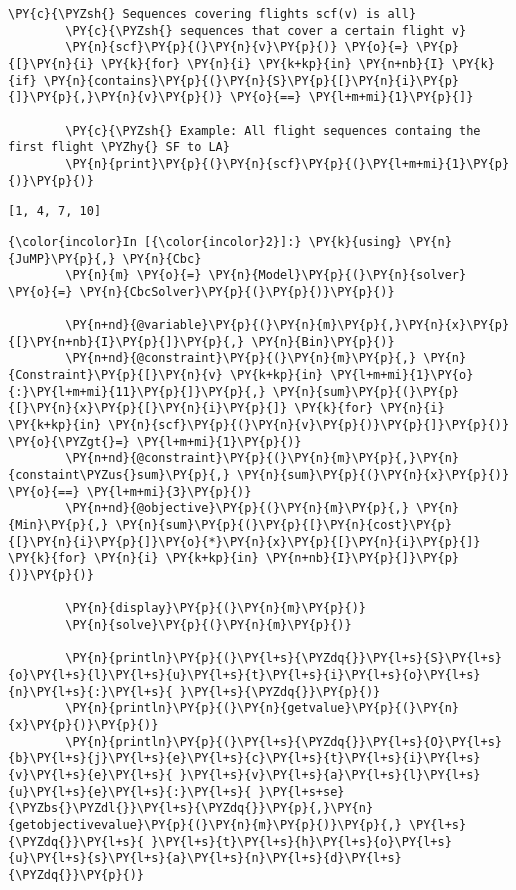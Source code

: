 \begin{Verbatim}[commandchars=\\\{\}]
        \PY{c}{\PYZsh{} Sequences covering flights scf(v) is all}
        \PY{c}{\PYZsh{} sequences that cover a certain flight v}
        \PY{n}{scf}\PY{p}{(}\PY{n}{v}\PY{p}{)} \PY{o}{=} \PY{p}{[}\PY{n}{i} \PY{k}{for} \PY{n}{i} \PY{k+kp}{in} \PY{n+nb}{I} \PY{k}{if} \PY{n}{contains}\PY{p}{(}\PY{n}{S}\PY{p}{[}\PY{n}{i}\PY{p}{]}\PY{p}{,}\PY{n}{v}\PY{p}{)} \PY{o}{==} \PY{l+m+mi}{1}\PY{p}{]}
        
        \PY{c}{\PYZsh{} Example: All flight sequences containg the first flight \PYZhy{} SF to LA}
        \PY{n}{print}\PY{p}{(}\PY{n}{scf}\PY{p}{(}\PY{l+m+mi}{1}\PY{p}{)}\PY{p}{)}
\end{Verbatim}


    \begin{Verbatim}[commandchars=\\\{\}]
[1, 4, 7, 10]
    \end{Verbatim}

    \begin{Verbatim}[commandchars=\\\{\}]
{\color{incolor}In [{\color{incolor}2}]:} \PY{k}{using} \PY{n}{JuMP}\PY{p}{,} \PY{n}{Cbc}
        \PY{n}{m} \PY{o}{=} \PY{n}{Model}\PY{p}{(}\PY{n}{solver} \PY{o}{=} \PY{n}{CbcSolver}\PY{p}{(}\PY{p}{)}\PY{p}{)}
        
        \PY{n+nd}{@variable}\PY{p}{(}\PY{n}{m}\PY{p}{,}\PY{n}{x}\PY{p}{[}\PY{n+nb}{I}\PY{p}{]}\PY{p}{,} \PY{n}{Bin}\PY{p}{)}
        \PY{n+nd}{@constraint}\PY{p}{(}\PY{n}{m}\PY{p}{,} \PY{n}{Constraint}\PY{p}{[}\PY{n}{v} \PY{k+kp}{in} \PY{l+m+mi}{1}\PY{o}{:}\PY{l+m+mi}{11}\PY{p}{]}\PY{p}{,} \PY{n}{sum}\PY{p}{(}\PY{p}{[}\PY{n}{x}\PY{p}{[}\PY{n}{i}\PY{p}{]} \PY{k}{for} \PY{n}{i} \PY{k+kp}{in} \PY{n}{scf}\PY{p}{(}\PY{n}{v}\PY{p}{)}\PY{p}{]}\PY{p}{)} \PY{o}{\PYZgt{}=} \PY{l+m+mi}{1}\PY{p}{)}
        \PY{n+nd}{@constraint}\PY{p}{(}\PY{n}{m}\PY{p}{,}\PY{n}{constaint\PYZus{}sum}\PY{p}{,} \PY{n}{sum}\PY{p}{(}\PY{n}{x}\PY{p}{)} \PY{o}{==} \PY{l+m+mi}{3}\PY{p}{)}
        \PY{n+nd}{@objective}\PY{p}{(}\PY{n}{m}\PY{p}{,} \PY{n}{Min}\PY{p}{,} \PY{n}{sum}\PY{p}{(}\PY{p}{[}\PY{n}{cost}\PY{p}{[}\PY{n}{i}\PY{p}{]}\PY{o}{*}\PY{n}{x}\PY{p}{[}\PY{n}{i}\PY{p}{]} \PY{k}{for} \PY{n}{i} \PY{k+kp}{in} \PY{n+nb}{I}\PY{p}{]}\PY{p}{)}\PY{p}{)}
        
        \PY{n}{display}\PY{p}{(}\PY{n}{m}\PY{p}{)}
        \PY{n}{solve}\PY{p}{(}\PY{n}{m}\PY{p}{)}
        
        \PY{n}{println}\PY{p}{(}\PY{l+s}{\PYZdq{}}\PY{l+s}{S}\PY{l+s}{o}\PY{l+s}{l}\PY{l+s}{u}\PY{l+s}{t}\PY{l+s}{i}\PY{l+s}{o}\PY{l+s}{n}\PY{l+s}{:}\PY{l+s}{ }\PY{l+s}{\PYZdq{}}\PY{p}{)}
        \PY{n}{println}\PY{p}{(}\PY{n}{getvalue}\PY{p}{(}\PY{n}{x}\PY{p}{)}\PY{p}{)}
        \PY{n}{println}\PY{p}{(}\PY{l+s}{\PYZdq{}}\PY{l+s}{O}\PY{l+s}{b}\PY{l+s}{j}\PY{l+s}{e}\PY{l+s}{c}\PY{l+s}{t}\PY{l+s}{i}\PY{l+s}{v}\PY{l+s}{e}\PY{l+s}{ }\PY{l+s}{v}\PY{l+s}{a}\PY{l+s}{l}\PY{l+s}{u}\PY{l+s}{e}\PY{l+s}{:}\PY{l+s}{ }\PY{l+s+se}{\PYZbs{}\PYZdl{}}\PY{l+s}{\PYZdq{}}\PY{p}{,}\PY{n}{getobjectivevalue}\PY{p}{(}\PY{n}{m}\PY{p}{)}\PY{p}{,} \PY{l+s}{\PYZdq{}}\PY{l+s}{ }\PY{l+s}{t}\PY{l+s}{h}\PY{l+s}{o}\PY{l+s}{u}\PY{l+s}{s}\PY{l+s}{a}\PY{l+s}{n}\PY{l+s}{d}\PY{l+s}{\PYZdq{}}\PY{p}{)}
\end{Verbatim}

